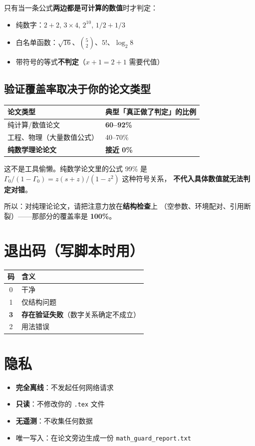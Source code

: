 \documentclass[11pt,UTF8]{ctexart}
\begin{document}
只有当一条公式\textbf{两边都是可计算的数值}时才判定：
\begin{itemize}
\item 纯数字：$2+2$, $3\times4$, $2^{10}$, $1/2+1/3$
\item 白名单函数：$\sqrt{16}$、$\binom{5}{2}$、$5!$、$\log_2 8$
\item 带符号的等式\textbf{不判定}（$x+1=2+1$ 需要代值）
\end{itemize}

\subsection*{验证覆盖率取决于你的论文类型}
\begin{center}
\begin{tabular}{@{}p{5.5cm}p{9cm}@{}}
\toprule
论文类型 & 典型「真正做了判定」的比例\\
\midrule
纯计算/数值论文 & \textbf{60--92\%}\\
工程、物理（大量数值公式） & 40--70\%\\
\textbf{纯数学理论论文} & \textbf{接近 0\%}\\
\bottomrule
\end{tabular}
\end{center}

这不是工具偷懒。纯数学论文里的公式 99\% 是
$\Gamma_0/(1-\Gamma_0)=z(s+z)/(1-z^2)$ 这种符号关系，
\textbf{不代入具体数值就无法判定对错}。

\begin{notebox}
所以：对纯理论论文，请把注意力放在\textbf{结构检查}上
（空参数、环境配对、引用断裂）——那部分的覆盖率是 \textbf{100\%}。
\end{notebox}

\section{退出码（写脚本时用）}
\begin{center}
\begin{tabular}{@{}cl@{}}
\toprule
码 & 含义\\
\midrule
0 & 干净\\
1 & 仅结构问题\\
\textbf{3} & \textbf{存在验证失败}（数字关系确定不成立）\\
2 & 用法错误\\
\bottomrule
\end{tabular}
\end{center}

\section{隐私}
\begin{itemize}
\item \textbf{完全离线}：不发起任何网络请求
\item \textbf{只读}：不修改你的 \texttt{.tex} 文件
\item \textbf{无遥测}：不收集任何数据
\item 唯一写入：在论文旁边生成一份 \texttt{math\_guard\_report.txt}
\end{itemize}
\end{document}
